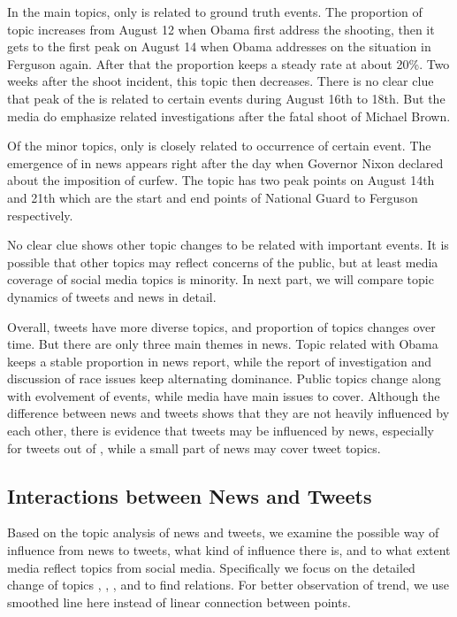 In the main topics, only \obamatalk is related to ground truth events. The proportion of topic \obamatalk increases from August 12 when Obama first address the shooting, then it gets to the first peak on August 14 when Obama addresses on the situation in Ferguson again. After that the proportion keeps a steady rate at about 20\%. Two weeks after the shoot incident, this topic then decreases. There is no clear clue that peak of the \shootincident is related to certain events during August 16th to 18th. But the media do emphasize related investigations after the fatal shoot of Michael Brown.

Of the minor topics, only \curfew is closely related to occurrence of certain event. The emergence of \curfew in news appears right after the day when Governor Nixon declared about the imposition of curfew. The topic \protest has two peak points on August 14th and 21th which are the start and end points of National Guard to Ferguson respectively.

No clear clue shows other topic changes to be related with important events. It is possible that other topics may reflect concerns of the public, but at least media coverage of social media topics is minority. In next part, we will compare topic dynamics of tweets and news in detail.

Overall, tweets have more diverse topics, and proportion of topics changes over time. But there are only three main themes in news. Topic related with Obama keeps a stable proportion in news report, while the report of investigation and discussion of race issues keep alternating dominance. Public topics change along with evolvement of events, while media have main issues to cover. Although the difference between news and tweets shows that they are not heavily influenced by each other, there is evidence that tweets may be influenced by news, especially for tweets out of \stlouis, while a small part of news may cover tweet topics.

\subsection{Interactions between News and Tweets}
Based on the topic analysis of news and tweets, we examine the possible way of influence from news to tweets, what kind of influence there is, and to what extent media reflect topics from social media. Specifically we focus on the detailed change of topics \pray, \emotion, \michaelbrown, \newsreport and \racism to find relations. For better observation of trend, we use smoothed line here instead of linear connection between points.

